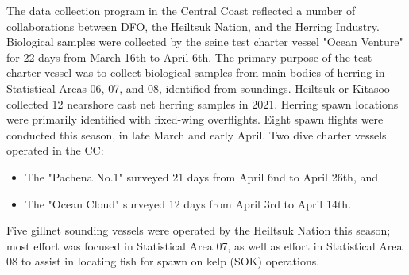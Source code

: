 The data collection program in the Central Coast reflected a number of
collaborations between DFO, the Heiltsuk Nation, and the Herring Industry.
Biological samples were collected by the seine test charter vessel "Ocean Venture"
for 22 days from March 16th to April 6th.
The primary purpose of the test charter vessel was to collect biological samples
from main bodies of herring in Statistical Areas 06, 07, and 08, identified from soundings.
Heiltsuk or Kitasoo collected 12 nearshore cast net herring samples in 2021.
Herring spawn locations were primarily identified with fixed-wing overflights.
Eight spawn flights were conducted this season, in late March and early April.
Two dive charter vessels operated in the CC:
\begin{itemize}
\item The "Pachena No.1" surveyed 21 days from April 6nd to April 26th, and
\item The "Ocean Cloud" surveyed 12 days from April 3rd to April 14th.
\end{itemize}
Five gillnet sounding vessels were operated by the Heiltsuk Nation this season;
most effort was focused in Statistical Area 07, as well as
effort in Statistical Area 08 to assist in locating fish
for spawn on kelp (SOK) operations.

